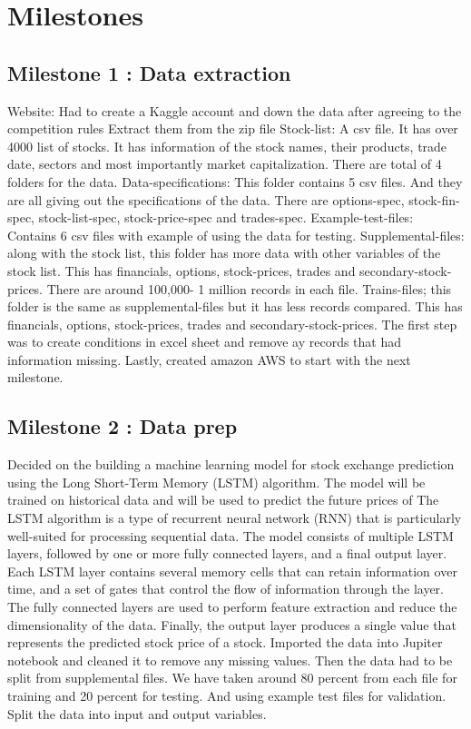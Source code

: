 \documentclass{article}
\begin{document}
\section{Milestones }
\subsection{Milestone 1 : Data extraction }
Website: 
Had to create a Kaggle account and down the data after agreeing to the competition rules 
Extract them from the zip file 
Stock-list: A csv file. It has over 4000 list of stocks. It has information of the stock names, their products, trade date, sectors and most importantly market capitalization. 
There are total of 4 folders for the data. 
Data-specifications: This folder contains 5 csv files. And they are all giving out the specifications of the data. There are options-spec, stock-fin-spec, stock-list-spec, stock-price-spec and trades-spec. 
Example-test-files: Contains  6 csv files with example of using the data for testing. 
Supplemental-files: along with the stock list, this folder has more data with other variables of the stock list. This has financials, options, stock-prices, trades and secondary-stock-prices. There are around 100,000- 1 million records in each file. 
Trains-files; this folder is the same as supplemental-files but it has less records compared. This has financials, options, stock-prices, trades and secondary-stock-prices. 
The first step was to create conditions in excel sheet and remove ay records that had information missing.
Lastly, created amazon AWS to start with the next milestone. 


\subsection{Milestone 2 : Data prep }
Decided on the building a machine learning model for stock exchange prediction using the Long Short-Term Memory (LSTM) algorithm. The model will be trained on historical data and will be used to predict the future prices of The LSTM algorithm is a type of recurrent neural network (RNN) that is particularly well-suited for processing sequential data. The model consists of multiple LSTM layers, followed by one or more fully connected layers, and a final output layer. Each LSTM layer contains several memory cells that can retain information over time, and a set of gates that control the flow of information through the layer. The fully connected layers are used to perform feature extraction and reduce the dimensionality of the data. Finally, the output layer produces a single value that represents the predicted stock price of a stock.
Imported the data into Jupiter notebook and cleaned it to remove any missing values. 
Then the data had to be split from supplemental files. We have taken around 80 percent from each file for training and 20 percent for testing. And using example test files for validation. 
Split the data into input and output variables. 
\end{document}
